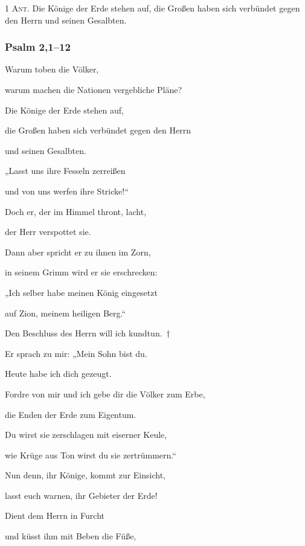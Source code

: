 \noindent \textsc{1 Ant.} Die Könige der Erde stehen auf, die Großen haben sich verbündet gegen den Herrn und seinen Gesalbten.

\subsubsection{Psalm 2,1--12}

\noindent Warum toben die Völker,~\GreStar{}~\nopagebreak

warum machen die Nationen vergebliche Pläne?
 
\noindent Die Könige der Erde stehen auf,~\GreStar{}~\nopagebreak

die Großen haben sich verbündet gegen den Herrn 

und seinen Gesalbten.
 
\noindent „Lasst uns ihre Fesseln zerreißen~\GreStar{}~\nopagebreak

und von uns werfen ihre Stricke!“
 
\noindent Doch er, der im Himmel thront, lacht,~\GreStar{}~\nopagebreak

der Herr verspottet sie.
 
\noindent Dann aber spricht er zu ihnen im Zorn,~\GreStar{}~\nopagebreak

in seinem Grimm wird er sie erschrecken:
 
\noindent „Ich selber habe meinen König eingesetzt~\GreStar{}~\nopagebreak

auf Zion, meinem heiligen Berg.“
 
\noindent Den Beschluss des Herrn will ich kundtun.~†~\nopagebreak

Er sprach zu mir: „Mein Sohn bist du.~\GreStar{}~\nopagebreak

Heute habe ich dich gezeugt.
 
\noindent Fordre von mir und ich gebe dir die Völker zum Erbe,~\GreStar{}~\nopagebreak

die Enden der Erde zum Eigentum.
 
\noindent Du wirst sie zerschlagen mit eiserner Keule,~\GreStar{}~\nopagebreak

wie Krüge aus Ton wirst du sie zertrümmern.“
 
\noindent Nun denn, ihr Könige, kommt zur Einsicht,~\GreStar{}~\nopagebreak

lasst euch warnen, ihr Gebieter der Erde!
 
\noindent Dient dem Herrn in Furcht~\GreStar{}~\nopagebreak

und küsst ihm mit Beben die Füße,
 
